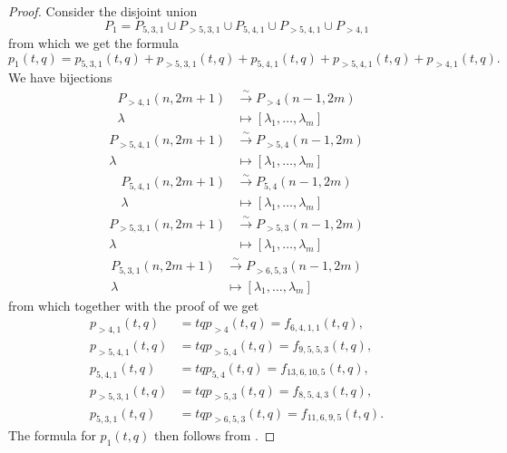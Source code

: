 \documentclass[12pt, a4paper]{article}
\begin{document}
\begin{proof}
  Consider the disjoint union
  \begin{equation*}
    P_1 = P_{5, 3, 1} \cup P_{>5, 3, 1} \cup P_{5, 4, 1} \cup P_{>5, 4, 1} \cup P_{>4, 1}
  \end{equation*}
  from which we get the formula
  \begin{equation*}
    p_1(t, q) = p_{5, 3, 1}(t, q) + p_{>5, 3, 1}(t, q) + p_{5, 4, 1}(t, q) + p_{>5, 4, 1}(t, q) + p_{>4, 1}(t, q).
  \end{equation*}
  We have bijections
  \begin{align*}
    P_{>4, 1}(n, 2m + 1) &\xrightarrow{\sim} P_{>4}(n - 1, 2m) \\
    \lambda &\mapsto [\lambda_1, \dots, \lambda_m]
  \end{align*}
  \begin{align*}
    P_{>5, 4, 1}(n, 2m + 1) &\xrightarrow{\sim} P_{>5, 4}(n - 1, 2m) \\
    \lambda & \mapsto [\lambda_1, \dots, \lambda_m]
  \end{align*}
  \begin{align*}
    P_{5, 4, 1}(n, 2m + 1) &\xrightarrow{\sim} P_{5, 4}(n - 1, 2m) \\
    \lambda &\mapsto [\lambda_1, \dots, \lambda_m]
  \end{align*}
  \begin{align*}
    P_{>5, 3, 1}(n, 2m + 1) &\xrightarrow{\sim} P_{>5, 3}(n - 1, 2m) \\
    \lambda &\mapsto [\lambda_1, \dots, \lambda_m]
  \end{align*}
  \begin{align*}
    P_{5, 3, 1}(n, 2m + 1) &\xrightarrow{\sim} P_{>6, 5, 3}(n - 1, 2m) \\
    \lambda &\mapsto [\lambda_1, \dots, \lambda_m]
  \end{align*}
  from which together with the proof of  we get
  \begin{align*}
    p_{>4, 1}(t, q) &= tqp_{>4}(t, q) = f_{6, 4, 1, 1}(t, q), \\
    p_{>5, 4, 1}(t, q) &= tqp_{>5, 4}(t, q) = f_{9, 5, 5, 3}(t, q), \\
    p_{5, 4, 1}(t, q) &= tqp_{5, 4}(t, q) = f_{13, 6, 10, 5}(t, q), \\
    p_{>5, 3, 1}(t, q) &= tqp_{>5, 3}(t, q) = f_{8, 5, 4, 3}(t, q), \\
    p_{5, 3, 1}(t, q) &= tqp_{>6, 5, 3}(t, q) = f_{11, 6, 9, 5}(t, q).
  \end{align*}
  The formula for $p_1(t, q)$ then follows from .
\end{proof}
\end{document}
